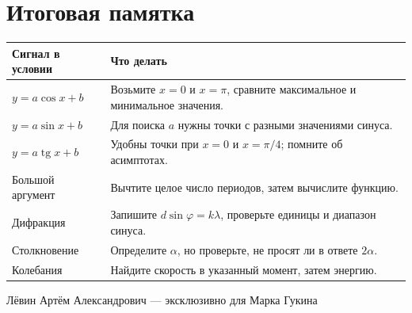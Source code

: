 \documentclass[a4paper,11pt]{article}
\begin{document}
\vspace{9mm}
\section*{Итоговая памятка}
\renewcommand{\arraystretch}{1.4}
\begin{tabularx}{\textwidth}{@{}p{}X@{}}\toprule
\textbf{Сигнал в условии} & \textbf{Что делать}\\ \midrule
$y=a\cos x+b$ & Возьмите $x=0$ и $x=\pi$, сравните максимальное и минимальное значения.\\
$y=a\sin x+b$ & Для поиска $a$ нужны точки с разными значениями синуса.\\
$y=a\operatorname{tg}x+b$ & Удобны точки при $x=0$ и $x=\pi/4$; помните об асимптотах.\\
Большой аргумент & Вычтите целое число периодов, затем вычислите функцию.\\
Дифракция & Запишите $d\sin\varphi=k\lambda$, проверьте единицы и диапазон синуса.\\
Столкновение & Определите $\alpha$, но проверьте, не просят ли в ответе $2\alpha$.\\
Колебания & Найдите скорость в указанный момент, затем энергию.\\
\bottomrule\end{tabularx}
\vfill
\begin{center}{\footnotesize\color{muted}Лёвин Артём Александрович --- эксклюзивно для Марка Гукина}\end{center}
\end{document}
